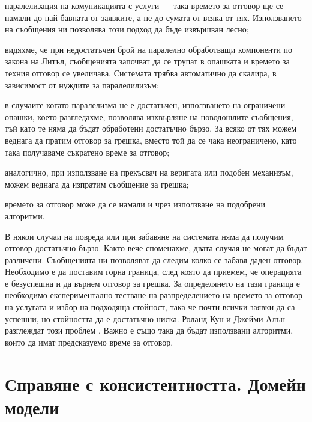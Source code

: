 \begin{itemize*}
  \item паралелизация на комуникацията с услуги — така времето за отговор ще се намали до най-бавната от заявките, а не до сумата от всяка от тях. Използването на съобщения ни позволява този подход да бъде извършван лесно;
  \item видяхме, че при недостатъчен брой на паралелно обработващи компоненти по закона на Литъл, съобщенията започват да се трупат в опашката и времето за техния отговор се увеличава. Системата трябва автоматично да скалира, в зависимост от нуждите за паралелилизъм;
  \item в случаите когато паралелизма не е достатъчен, използването на ограничени опашки, което разгледахме, позволява изхвърляне на новодошлите съобщения, тъй като те няма да бъдат обработени достатъчно бързо. За всяко от тях можем веднага да пратим отговор за грешка, вместо той да се чака неограничено, като така получаваме съкратено време за отговор;
  \item аналогично, при използване на прекъсвач на веригата или подобен механизъм, можем веднага да изпратим съобщение за грешка;
  \item времето за отговор може да се намали и чрез използване на подобрени алгоритми.
\end{itemize*}

В някои случаи на повреда или при забавяне на системата няма да получим отговор достатъчно бързо. Както вече споменахме, двата случая не могат да бъдат различени. Съобщенията ни позволяват да следим колко се забавя даден отговор. Необходимо е да поставим горна граница, след която да приемем, че операцията е безуспешна и да върнем отговор за грешка. За определянето на тази граница е необходимо експериментално тестване на разпределението на времето за отговор на услугата и избор на подходяща стойност, така че почти всички заявки да са успешни, но стойността да е достатъчно ниска. Роланд Кун и Джейми Алън разглеждат този проблем \cite{kuhn2015ReactiveDesignPatterns}. Важно е също така да бъдат използвани алгоритми, които да имат предсказуемо време за отговор.

\section{Справяне с консистентността. Домейн модели}
\label{sec:dealing-with-consistency}

